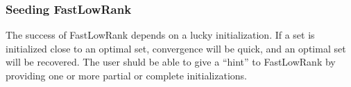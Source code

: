 \documentclass{article}
\begin{document}
\subsubsection{Seeding FastLowRank}
The success of FastLowRank depends on a lucky initialization. If a set is initialized close to an optimal set, convergence will be quick, and an optimal set will be recovered. The user shuld be able to give a ``hint'' to FastLowRank by providing one or more partial or complete initializations. 
\end{document}
